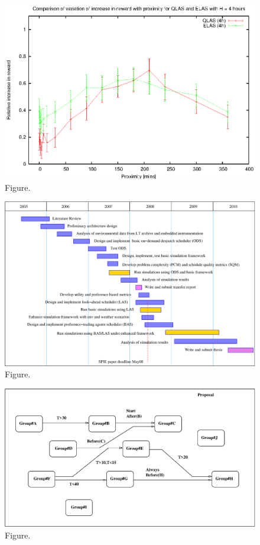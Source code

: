 \documentclass[12pt,a4paper]{article}
\begin{document}
\begin{figure}[htbp]
 \begin{center}
  \includegraphics[scale=1.0, angle=0]{figures/evplot_4.eps}
 \end{center}
  \caption[Figure.]
{Figure.}
\end{figure}
\clearpage
\begin{figure}[htbp]
 \begin{center}
  \includegraphics[scale=1.0, angle=0]{figures/gantt.eps}
 \end{center}
  \caption[Figure.]
{Figure.}
\end{figure}
\clearpage
\begin{figure}[htbp]
 \begin{center}
  \includegraphics[scale=1.0, angle=0]{figures/group_linking.eps}
 \end{center}
  \caption[Figure.]
{Figure.}
\end{figure}
\end{document}
